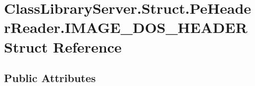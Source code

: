 \hypertarget{struct_class_library_server_1_1_struct_1_1_pe_header_reader_1_1_i_m_a_g_e___d_o_s___h_e_a_d_e_r}{}\section{Class\+Library\+Server.\+Struct.\+Pe\+Header\+Reader.\+I\+M\+A\+G\+E\+\_\+\+D\+O\+S\+\_\+\+H\+E\+A\+D\+ER Struct Reference}
\label{struct_class_library_server_1_1_struct_1_1_pe_header_reader_1_1_i_m_a_g_e___d_o_s___h_e_a_d_e_r}
\subsection*{Public Attributes}
